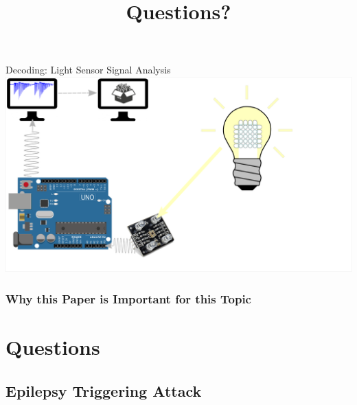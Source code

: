 \documentclass[11pt,t,usepdftitle=false,aspectratio=169]{beamer}
\begin{document}
\begin{frame}{Decoding: Light Sensor Signal Analysis}
{    }
     {
        \centering
        \includegraphics{img/Decoding_5.png}
    }
\end{frame}

\subsubsection{Why this Paper is Important for this Topic}%
\label{sub:why_this_paper_is_important_for_this_topic}


\title{Questions?}
\subtitle{}
\section{Questions}


\appendix
\subsection{Epilepsy Triggering Attack}%
\label{sub:epilepsy_triggering_attack}
\end{document}
